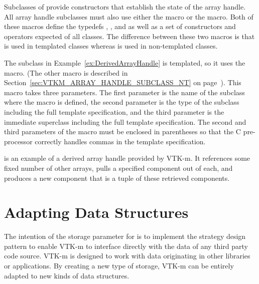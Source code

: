 Subclasses of  provide constructors that
establish the state of the array handle. All array handle subclasses must
also use either the  macro or the
 macro. Both of these macros
define the typedefs , , and
 as well as a set of constructors and operators
expected of all  classes. The difference
between these two macros is that 
is used in templated classes whereas
 is used in non-templated
classes.

The  subclass in
Example~\ref{ex:DerivedArrayHandle} is templated, so it uses the
 macro. (The other macro is
described in Section~\ref{sec:VTKM_ARRAY_HANDLE_SUBCLASS_NT} on
page~\pageref{sec:VTKM_ARRAY_HANDLE_SUBCLASS_NT}). This macro takes three
parameters. The first parameter is the name of the subclass where the macro
is defined, the second parameter is the type of the subclass including the
full template specification, and the third parameter is the immediate
superclass including the full template specification. The second and third
parameters of the macro must be enclosed in parentheses so that the C
pre-processor correctly handles commas in the template specification.

 is an example of a derived array
handle provided by VTK-m. It references some fixed number of other arrays,
pulls a specified component out of each, and produces a new component that
is a tuple of these retrieved components.





\section{Adapting Data Structures}
\label{sec:ArrayHandle:Adapting}


The intention of the storage parameter for  is to
implement the strategy design pattern to enable VTK-m to interface directly
with the data of any third party code source. VTK-m is designed to work
with data originating in other libraries or applications. By creating a new
type of storage, VTK-m can be entirely adapted to new kinds of data
structures.

